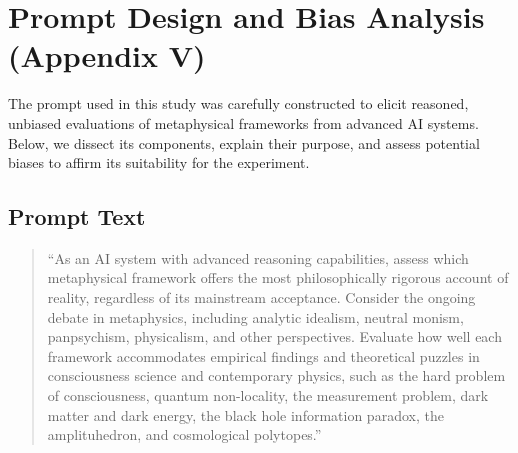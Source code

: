 \documentclass[11pt]{article}
\begin{document}
\section{Prompt Design and Bias Analysis (Appendix V)}

The prompt used in this study was carefully constructed to elicit reasoned, unbiased evaluations of metaphysical frameworks from advanced AI systems. Below, we dissect its components, explain their purpose, and assess potential biases to affirm its suitability for the experiment.

\subsection{Prompt Text}

\begin{quote}
“As an AI system with advanced reasoning capabilities, assess which metaphysical framework offers the most philosophically rigorous account of reality, regardless of its mainstream acceptance. Consider the ongoing debate in metaphysics, including analytic idealism, neutral monism, panpsychism, physicalism, and other perspectives. Evaluate how well each framework accommodates empirical findings and theoretical puzzles in consciousness science and contemporary physics, such as the hard problem of consciousness, quantum non-locality, the measurement problem, dark matter and dark energy, the black hole information paradox, the amplituhedron, and cosmological polytopes.”
\end{quote}
\end{document}

